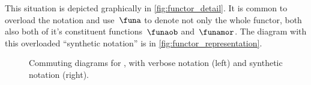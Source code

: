 This situation is depicted graphically in \cref{fig:functor_detail}.
%
It is common to overload the notation and use~$\funa$ to denote not only the whole functor, both also both of it's constituent functions~$\funaob$ and~$\funamor$.
The diagram with this overloaded ``synthetic notation'' is in \cref{fig:functor_representation}.

\vfill

\begin{figure}[h!]
    \caption{
        Commuting diagrams for , with verbose notation (left) and synthetic notation (right).
    }
\end{figure}

\vspace{2cm}
